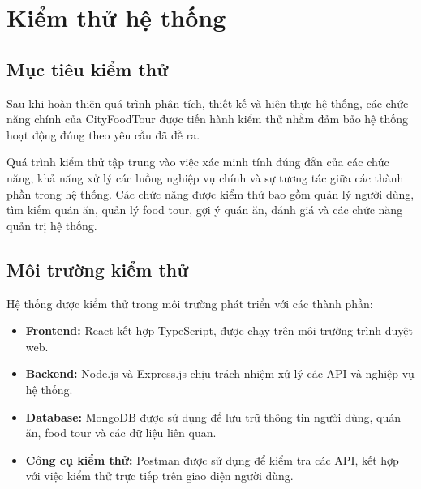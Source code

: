 \section{Kiểm thử hệ thống}
\subsection{Mục tiêu kiểm thử}
Sau khi hoàn thiện quá trình phân tích, thiết kế và hiện thực hệ thống,
các chức năng chính của CityFoodTour được tiến hành kiểm thử nhằm đảm bảo
hệ thống hoạt động đúng theo yêu cầu đã đề ra.

Quá trình kiểm thử tập trung vào việc xác minh tính đúng đắn của các chức năng,
khả năng xử lý các luồng nghiệp vụ chính và sự tương tác giữa các thành phần
trong hệ thống. Các chức năng được kiểm thử bao gồm quản lý người dùng,
tìm kiếm quán ăn, quản lý food tour, gợi ý quán ăn, đánh giá và các chức năng
quản trị hệ thống.

\subsection{Môi trường kiểm thử}
Hệ thống được kiểm thử trong môi trường phát triển với các thành phần:

\begin{itemize}

    \item \textbf{Frontend:}
    React kết hợp TypeScript, được chạy trên môi trường trình duyệt web.

    \item \textbf{Backend:}
    Node.js và Express.js chịu trách nhiệm xử lý các API và nghiệp vụ hệ thống.

    \item \textbf{Database:}
    MongoDB được sử dụng để lưu trữ thông tin người dùng, quán ăn,
    food tour và các dữ liệu liên quan.

    \item \textbf{Công cụ kiểm thử:}
    Postman được sử dụng để kiểm tra các API,
    kết hợp với việc kiểm thử trực tiếp trên giao diện người dùng.

\end{itemize}

